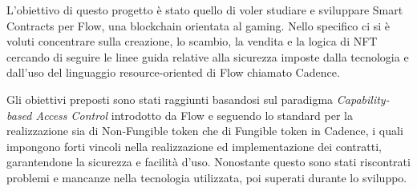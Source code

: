 L'obiettivo di questo progetto è stato quello di voler studiare e sviluppare Smart Contracts per Flow, una blockchain orientata al gaming. Nello specifico ci si è voluti concentrare sulla creazione, lo scambio, la vendita e la logica di NFT cercando di seguire le linee guida relative alla sicurezza imposte dalla tecnologia e dall'uso del linguaggio resource-oriented di Flow chiamato Cadence. 

Gli obiettivi preposti sono stati raggiunti basandosi sul paradigma \textit{Capability-based Access Control} introdotto da Flow e 
seguendo 
lo standard per la realizzazione sia di Non-Fungible token che di Fungible token in Cadence, i quali impongono forti vincoli nella realizzazione ed implementazione dei contratti, garantendone la sicurezza e facilità d'uso. Nonostante questo sono stati riscontrati problemi e mancanze nella tecnologia utilizzata, poi superati durante lo sviluppo.